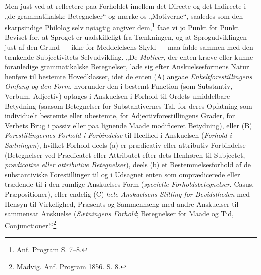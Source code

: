 \documentclass[12pt]{book}
\newcommand{\opage}[1]{\marginnote{\footnotesize\textit{[#1]}}}
\begin{document}
Men just ved at reflectere paa Forholdet imellem det
Directe og det Indirecte i „de grammatikalske Betegnelser“
og mærke os „Motiverne“, saaledes som den skarpsindige
Philolog selv nøiagtig angiver dem,\footnote{%
Anf. Program S. 7--8.} faae vi jo Punkt for Punkt
Beviset for, at Sproget er uadskilleligt fra Tænkningen, og
at Sprogudviklingen just af den Grund --- ikke for
Meddelelsens Skyld --- maa falde sammen med den tænkende
\opage{38}Subjectivitets Selvudvikling. „De \emph{Motiver}, der enten
kræve eller kunne foranledige grammatikalske Betegnelser, lade
sig efter Anskuelsesformens Natur henføre til bestemte
Hovedklasser, idet de enten (A) angaae \emph{Enkeltforestillingens
Omfang og den Form}, hvorunder den i bestemt Function
(som Substantiv, Verbum, Adjectiv) optages i Anskuelsen i
Forhold til Ordets umiddelbare Betydning (saasom Betegnelser
for Substantivernes Tal, for deres Opfatning som individuelt
bestemte eller ubestemte, for Adjectivforestillingens Grader, for
Verbets Brug i passiv eller paa lignende Maade modificeret
Betydning), eller (B) \emph{Forestillingernes Forhold i Forbindelse}
til Heelhed i Anskuelsen (\emph{Forhold i Sætningen}), hvilket
Forhold deels (a) er prædicativ eller attributiv Forbindelse
(Betegnelser ved Prædicatet eller Attributet efter dets Henhøren
til Subjectet, \emph{prædicative eller attributive
Betegnelser}), deels (b) et Bestemmelsesforhold af de
substantiviske Forestillinger til og i Udsagnet enten som omprædicerede
eller trædende til i den rumlige Anskuelses Form (\emph{specielle
Forholdsbetegnelser}. Casus, Præpositioner), eller endelig
(C) \emph{hele Anskuelsens Stilling for Bevidstheden}
med Hensyn til Virkelighed, Præsents og Sammenhæng med
andre Anskuelser til sammensat Anskuelse (\emph{Sætningens
Forhold}; Betegnelser for Maade og Tid, Conjunctioner!“\footnote{%
Madvig. Anf. Program 1856. S. 8.}
\end{document}
